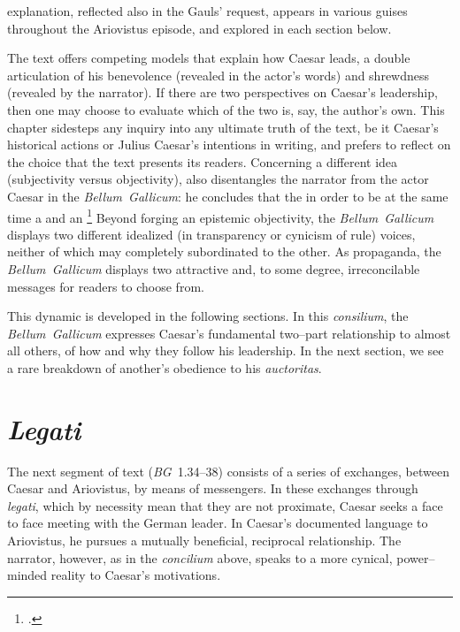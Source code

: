 \documentclass[12pt,letterpaper,oneside,final]{memoir}
\begin{document}
explanation, reflected also in the Gauls' request, appears in various guises throughout the Ariovistus episode, and explored in each section below.

The text offers competing models that explain how Caesar leads, a double articulation of his benevolence (revealed in the actor's words) and shrewdness (revealed by the narrator). If there are two perspectives on Caesar's leadership, then one may choose to evaluate which of the two is, say, the author's own. This chapter sidesteps any inquiry into any ultimate truth of the text, be it Caesar's historical actions or Julius Caesar's intentions in writing, and prefers to reflect on the choice that the text presents its readers. Concerning a different idea (subjectivity versus objectivity), \textcite[150--155]{riggsby2006} also disentangles the narrator from the actor Caesar in the \emph{Bellum~Gallicum}: he concludes that the  in order to be at the same time a  and an \footnote{\textcite[152]{riggsby2006}.} Beyond forging an epistemic objectivity, the \emph{Bellum~Gallicum} displays two different idealized (in transparency or cynicism of rule) voices, neither of which may completely subordinated to the other. As propaganda, the \emph{Bellum~Gallicum} displays two attractive and, to some degree, irreconcilable messages for readers to choose from.

This dynamic is developed in the following sections. In this \emph{consilium}, the \emph{Bellum~Gallicum} expresses Caesar's fundamental two--part relationship to almost all others, of how and why they follow his leadership. In the next section, we see a rare breakdown of another's obedience to his \emph{auctoritas}.

\section{\emph{Legati}}
\label{bg-legati}
The next segment of text (\emph{BG}~1.34--38) consists of a series of exchanges, between Caesar and Ariovistus, by means of messengers. In these exchanges through \emph{legati}, which by necessity mean that they are not proximate, Caesar seeks a face to face meeting with the German leader. In Caesar's documented language to Ariovistus, he pursues a mutually beneficial, reciprocal relationship. The narrator, however, as in the \emph{concilium} above, speaks to a more cynical, power--minded reality to Caesar's motivations.
\end{document}
